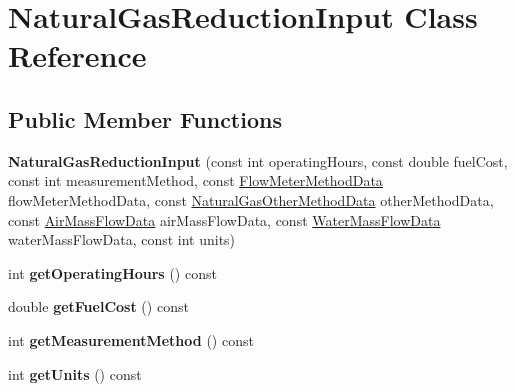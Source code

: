 \hypertarget{class_natural_gas_reduction_input}{}\section{Natural\+Gas\+Reduction\+Input Class Reference}
\label{class_natural_gas_reduction_input}
\subsection*{Public Member Functions}
\begin{DoxyCompactItemize}
\item 
\mbox{\label{class_natural_gas_reduction_input_a7595cc335adbd9b2f4965df0bc487fb2}} 
{\bfseries Natural\+Gas\+Reduction\+Input} (const int operating\+Hours, const double fuel\+Cost, const int measurement\+Method, const \hyperlink{class_flow_meter_method_data}{Flow\+Meter\+Method\+Data} flow\+Meter\+Method\+Data, const \hyperlink{class_natural_gas_other_method_data}{Natural\+Gas\+Other\+Method\+Data} other\+Method\+Data, const \hyperlink{class_air_mass_flow_data}{Air\+Mass\+Flow\+Data} air\+Mass\+Flow\+Data, const \hyperlink{class_water_mass_flow_data}{Water\+Mass\+Flow\+Data} water\+Mass\+Flow\+Data, const int units)
\item 
\mbox{\label{class_natural_gas_reduction_input_a2c73074bd0a2d80c7006f2a3d48f0478}} 
int {\bfseries get\+Operating\+Hours} () const
\item 
\mbox{\label{class_natural_gas_reduction_input_a3a7d17dcb66d4f7c585e79e6bc4ea15a}} 
double {\bfseries get\+Fuel\+Cost} () const
\item 
\mbox{\label{class_natural_gas_reduction_input_addeaed7fa85f47fbb1249ed5b11c3c61}} 
int {\bfseries get\+Measurement\+Method} () const
\item 
\mbox{\label{class_natural_gas_reduction_input_aca31b58c9d95adf451fcfeaadd72cd0f}} 
int {\bfseries get\+Units} () const
\item 
\mbox{\label{class_natural_gas_reduction_input_a9ef559f0c33b772fb0c83611fcd0aeab}} 

\end{DoxyCompactItemize}
